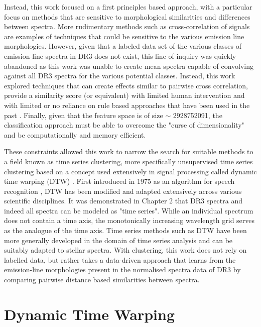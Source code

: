 Instead, this work focused on a first principles based approach, with a particular focus on methods that are sensitive to morphological similarities and differences between spectra. More rudimentary methods such as cross-correlation of signals are examples of techniques that could be sensitive to the various emission line morphologies. However, given that a labeled data set of the various classes of emission-line spectra in DR3 does not exist, this line of inquiry was quickly abandoned as this work was unable to create mean spectra capable of convolving against all DR3 spectra for the various potential classes. Instead, this work explored techniques that can create effects similar to pairwise cross correlation, provide a similarity score (or equivalent) with limited human intervention and with limited or no reliance on rule based approaches that have been used in the past \cite{traven2015gaia}. Finally, given that the feature space is of size $\sim$ \num[round-precision=2,round-mode=figures, scientific-notation=true]{2928752091}, the classification approach must be able to overcome the "curse of dimensionality" and be computationally and memory efficient. 

These constraints allowed this work to narrow the search for suitable methods to a field known as time series clustering, more specifically unsupervised time series clustering based on a concept used extensively in signal processing called dynamic time warping (DTW) \cite{kruskal1983overview}. First introduced in 1975 as an algorithm for speech recognition \cite{itakura1975minimum}, DTW has been modified and adapted extensively across various scientific disciplines. It was demonstrated in Chapter 2 that DR3 spectra and indeed all spectra can be modeled as "time series". While an individual spectrum does not contain a time axis, the monotonically increasing wavelength grid serves as the analogue of the time axis. Time series methods such as DTW have been more generally developed in the domain of time series analysis \cite{nielsen2019practical} and can be suitably adapted to stellar spectra. With clustering, this work does not rely on labelled data, but rather takes a data-driven approach that learns from the emission-line morphologies present in the normalised spectra data of DR3 by comparing pairwise distance based similarities between spectra.

\section{Dynamic Time Warping}


